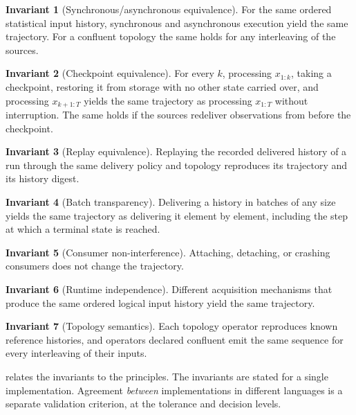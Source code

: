 \documentclass[11pt,a4paper]{article}
\theoremstyle{definition}
\newtheorem{invariant}{Invariant}
\theoremstyle{remark}
\begin{document}
\begin{invariant}[Synchronous/asynchronous equivalence]
\label{inv:async}
For the same ordered statistical input history, synchronous and
asynchronous execution yield the same trajectory. For a confluent
topology the same holds for any interleaving of the sources.
\end{invariant}

\begin{invariant}[Checkpoint equivalence]
\label{inv:checkpoint}
For every $k$, processing $x_{1:k}$, taking a checkpoint, restoring it
from storage with no other state carried over, and processing
$x_{k+1:T}$ yields the same trajectory as processing $x_{1:T}$ without
interruption. The same holds if the
sources redeliver observations from before the checkpoint.
\end{invariant}

\begin{invariant}[Replay equivalence]
\label{inv:replay}
Replaying the recorded delivered history of a run through the same
delivery policy and topology reproduces its trajectory and its history
digest.
\end{invariant}

\begin{invariant}[Batch transparency]
\label{inv:batch}
Delivering a history in batches of any size yields the same trajectory
as delivering it element by element, including the step at which a
terminal state is reached.
\end{invariant}

\begin{invariant}[Consumer non-interference]
\label{inv:consumers}
Attaching, detaching, or crashing consumers does not change the
trajectory.
\end{invariant}

\begin{invariant}[Runtime independence]
\label{inv:runtime}
Different acquisition mechanisms that produce the same ordered logical
input history yield the same trajectory.
\end{invariant}

\begin{invariant}[Topology semantics]
\label{inv:topology}
Each topology operator reproduces known reference histories, and
operators declared confluent emit the same sequence for every
interleaving of their inputs.
\end{invariant}

 relates the invariants to the principles. The
invariants are stated for a single implementation. Agreement
\emph{between} implementations in different languages is a separate
validation criterion, at the tolerance and decision levels.
\end{document}
